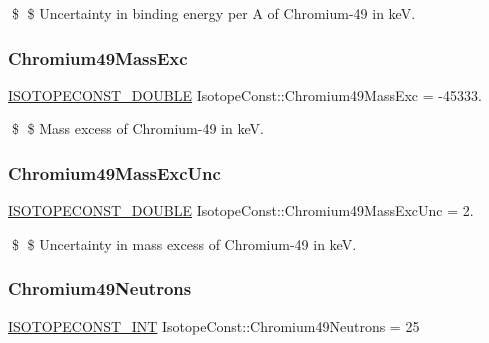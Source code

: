 \$ \$ Uncertainty in binding energy per A of Chromium-\/49 in keV. \mbox{\label{group___isotope_const-_chromium-_cr49_ga9eb680033d5ec3ac7d210797aed93038}} 
\subsubsection{\texorpdfstring{Chromium49\+Mass\+Exc}{Chromium49MassExc}}
{\footnotesize\ttfamily \mbox{\hyperlink{group___isotope_const-_macros_ga8f45a7272ce02c0b4c65c44636ed719a}{I\+S\+O\+T\+O\+P\+E\+C\+O\+N\+S\+T\+\_\+\+D\+O\+U\+B\+LE}} Isotope\+Const\+::\+Chromium49\+Mass\+Exc = -\/45333.}

\$ \$ Mass excess of Chromium-\/49 in keV. \mbox{\label{group___isotope_const-_chromium-_cr49_ga3d17a67673c2687f7d284ca6dea750d4}} 
\subsubsection{\texorpdfstring{Chromium49\+Mass\+Exc\+Unc}{Chromium49MassExcUnc}}
{\footnotesize\ttfamily \mbox{\hyperlink{group___isotope_const-_macros_ga8f45a7272ce02c0b4c65c44636ed719a}{I\+S\+O\+T\+O\+P\+E\+C\+O\+N\+S\+T\+\_\+\+D\+O\+U\+B\+LE}} Isotope\+Const\+::\+Chromium49\+Mass\+Exc\+Unc = 2.}

\$ \$ Uncertainty in mass excess of Chromium-\/49 in keV. \mbox{\label{group___isotope_const-_chromium-_cr49_gabf4ef8e79288f1ca2bd9e06ab1c32789}} 
\subsubsection{\texorpdfstring{Chromium49\+Neutrons}{Chromium49Neutrons}}
{\footnotesize\ttfamily \mbox{\hyperlink{group___isotope_const-_macros_ga5f18360b3e99483a35c32d789e62621c}{I\+S\+O\+T\+O\+P\+E\+C\+O\+N\+S\+T\+\_\+\+I\+NT}} Isotope\+Const\+::\+Chromium49\+Neutrons = 25}

